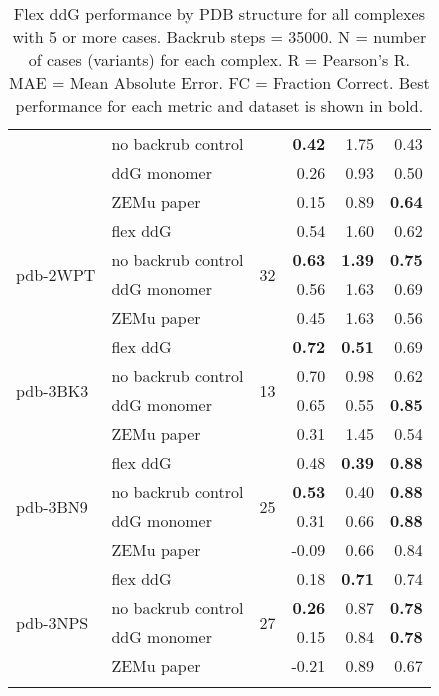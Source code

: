 {\begin{longtable}{llrrrr}
 & no backrub control & & \textbf{0.42} & 1.75 & 0.43  \\
 & ddG monomer & & 0.26 & 0.93 & 0.50  \\
 & ZEMu paper & & 0.15 & 0.89 & \textbf{0.64}  \\
\hline
 \multirow{ 4}{*}{pdb-2WPT} & flex ddG & \multirow{ 4}{*}{32} & 0.54 & 1.60 & 0.62  \\
 & no backrub control & & \textbf{0.63} & \textbf{1.39} & \textbf{0.75}  \\
 & ddG monomer & & 0.56 & 1.63 & 0.69  \\
 & ZEMu paper & & 0.45 & 1.63 & 0.56  \\
\hline
 \multirow{ 4}{*}{pdb-3BK3} & flex ddG & \multirow{ 4}{*}{13} & \textbf{0.72} & \textbf{0.51} & 0.69  \\
 & no backrub control & & 0.70 & 0.98 & 0.62  \\
 & ddG monomer & & 0.65 & 0.55 & \textbf{0.85}  \\
 & ZEMu paper & & 0.31 & 1.45 & 0.54  \\
\hline
 \multirow{ 4}{*}{pdb-3BN9} & flex ddG & \multirow{ 4}{*}{25} & 0.48 & \textbf{0.39} & \textbf{0.88}  \\
 & no backrub control & & \textbf{0.53} & 0.40 & \textbf{0.88}  \\
 & ddG monomer & & 0.31 & 0.66 & \textbf{0.88}  \\
 & ZEMu paper & & -0.09 & 0.66 & 0.84  \\
\hline
 \multirow{ 4}{*}{pdb-3NPS} & flex ddG & \multirow{ 4}{*}{27} & 0.18 & \textbf{0.71} & 0.74  \\
 & no backrub control & & \textbf{0.26} & 0.87 & \textbf{0.78}  \\
 & ddG monomer & & 0.15 & 0.84 & \textbf{0.78}  \\
 & ZEMu paper & & -0.21 & 0.89 & 0.67  \\
\bottomrule
  \caption[Flex ddG performance by PDB structure for all complexes with 5 or more cases]{
    Flex ddG performance by PDB structure for all complexes with 5 or more cases. Backrub steps = 35000. N = number of cases (variants) for each complex. R = Pearson's R. MAE = Mean Absolute Error. FC = Fraction Correct. Best performance for each metric and dataset is shown in bold.
  } \label{tab:table-by-structure}
\end{longtable}

}